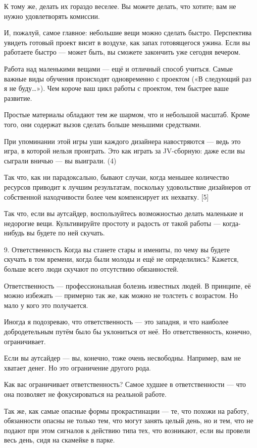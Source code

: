 \documentclass[ebook,12pt,oneside,openany]{memoir}
\begin{document}
К тому же, делать их гораздо веселее. Вы можете делать, что хотите;
вам не нужно удовлетворять комиссии.

И, пожалуй, самое главное: небольшие вещи можно сделать быстро.
Перспектива увидеть готовый проект висит в воздухе, как запах
готовящегося ужина. Если вы работаете быстро — может быть, вы сможете
закончить уже сегодня вечером.

Работа над маленькими вещами — ещё и отличный способ учиться. Самые
важные виды обучения происходят одновременно с проектом («В следующий
раз я не буду…»). Чем короче ваш цикл работы с проектом, тем быстрее
ваше развитие.

Простые материалы обладают тем же шармом, что и небольшой масштаб.
Кроме того, они содержат вызов сделать больше меньшими средствами.

При упоминании этой игры уши каждого дизайнера навостряются — ведь это
игра, в которой нельзя проиграть. Это как играть за JV-сборную: даже
если вы сыграли вничью — вы выиграли. (4)

Так что, как ни парадоксально, бывают случаи, когда меньшее количество
ресурсов приводит к лучшим результатам, поскольку удовольствие
дизайнеров от собственной находчивости более чем компенсирует их
нехватку. [5]

Так что, если вы аутсайдер, воспользуйтесь возможностью делать
маленькие и недорогие вещи. Культивируйте простоту и радость от такой
работы — когда-нибудь вы будете по ней скучать.

9. Ответственность Когда вы станете стары и имениты, по чему вы будете
скучать в том времени, когда были молоды и ещё не определились?
Кажется, больше всего люди скучают по отсутствию обязанностей.

Ответственность — профессиональная болезнь известных людей. В
принципе, её можно избежать — примерно так же, как можно не толстеть с
возрастом. Но мало у кого это получается.

Иногда я подозреваю, что ответственность — это западня, и что наиболее
добродетельным путём было бы уклониться от неё. Но ответственность,
конечно, ограничивает.

Если вы аутсайдер — вы, конечно, тоже очень несвободны. Например, вам
не хватает денег. Но это ограничение другого рода.

Как вас ограничивает ответственность? Самое худшее в ответственности —
что она позволяет не фокусироваться на реальной работе.

Так же, как самые опасные формы прокрастинации — те, что похожи на
работу, обязанности опасны не только тем, что могут занять целый день,
но и тем, что не подают при этом сигналов к действию типа тех, что
возникают, если вы провели весь день, сидя на скамейке в парке.
\end{document}
